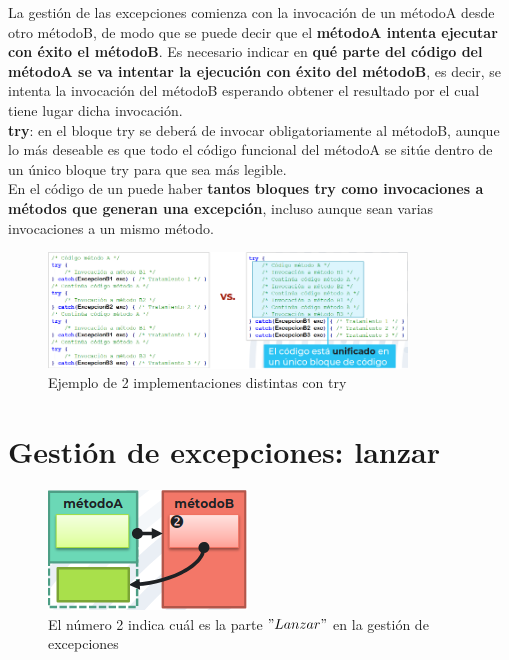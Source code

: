 \documentclass{article}
\begin{document}
La gestión de las excepciones comienza con la invocación de un métodoA desde otro métodoB, de modo que se puede decir que el \textbf{métodoA intenta ejecutar con éxito el métodoB}. Es necesario indicar en \textbf{qué parte del código del métodoA se va intentar la ejecución con éxito del métodoB}, es decir, se intenta la invocación del métodoB esperando obtener el resultado por el cual tiene lugar dicha invocación. \\
\textbf{try}: en el bloque try se deberá de invocar obligatoriamente al métodoB, aunque lo más deseable es que todo el código funcional del métodoA se sitúe dentro de un único bloque try para que sea más legible. \\

En el código de un puede haber \textbf{tantos bloques try como invocaciones a métodos que generan una excepción}, incluso aunque sean varias invocaciones a un mismo método.

\begin{figure}[h]
    \centering
    \includegraphics[width=0.85\textwidth]{img-t7/img_054_09.png}
    \caption{Ejemplo de 2 implementaciones distintas con try}
\end{figure}

\section{Gestión de excepciones: lanzar}

\begin{figure}
    \centering
    \includegraphics[width=\linewidth]{img-t7/img_118_00.png}
    \caption{El número 2 indica cuál es la parte $"Lanzar"$ en la gestión de excepciones}
\end{figure}
\end{document}

